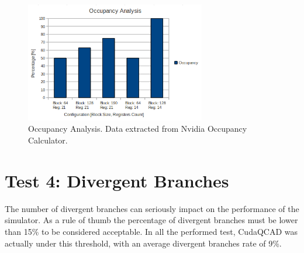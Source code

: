 \begin{figure}[h!bt]
        \centerline{\includegraphics[width=0.7\textwidth]{img/OccupancyAnalysis.png}}
        \caption{Occupancy Analysis. Data extracted from Nvidia Occupancy Calculator.}
        \label{fig:OccupancyAnalysis}
\end{figure}

\section{Test 4: Divergent Branches}
The number of divergent branches can seriously impact on the performance of the simulator. As a rule of thumb the percentage of divergent branches must be lower than 15\% to be considered acceptable. In all the performed test, CudaQCAD was actually under this threshold, with an average divergent branches rate of 9\%.   

